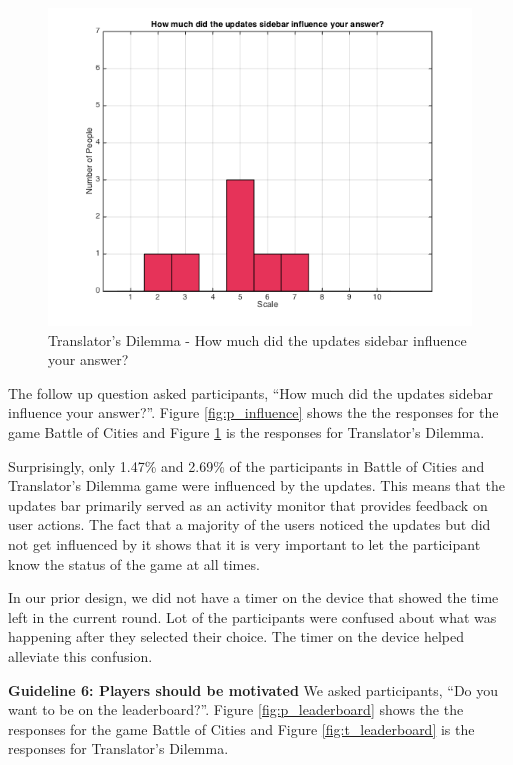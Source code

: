 \documentclass{sig-alternate}
\begin{document}
\begin{figure}
	\includegraphics[width=\linewidth]{t_influence.png}
	\caption{Translator's Dilemma - How much did the updates sidebar influence your answer?}
	\label{fig:t_influence}
\end{figure}

The follow up question asked participants, ``How much did the updates sidebar influence your answer?''. Figure \ref{fig:p_influence} shows the the responses for the game Battle of Cities and Figure \ref{fig:t_influence} is the responses for Translator's Dilemma.

Surprisingly, only 1.47\% and 2.69\% of the participants in Battle of Cities and Translator's Dilemma game were influenced by the updates. This means that the updates bar primarily served as an activity monitor that provides feedback on user actions. The fact that a majority of the users noticed the updates but did not get influenced by it shows that it is very important to let the participant know the status of the game at all times.

In our prior design, we did not have a timer on the device that showed the time left in the current round. Lot of the participants were confused about what was happening after they selected their choice. The timer on the device helped alleviate this confusion.

\textbf{Guideline 6: Players should be motivated}
We asked participants, ``Do you want to be on the leaderboard?''. Figure \ref{fig:p_leaderboard} shows the the responses for the game Battle of Cities and Figure \ref{fig:t_leaderboard} is the responses for Translator's Dilemma.
\end{document}
